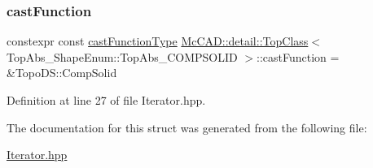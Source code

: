 \subsubsection{\texorpdfstring{cast\+Function}{castFunction}}
{\footnotesize\ttfamily constexpr const \hyperlink{structMcCAD_1_1detail_1_1TopClass_3_01TopAbs__ShapeEnum_1_1TopAbs__COMPSOLID_01_4_a110312d2c20be779990d50a4ca68b71f}{cast\+Function\+Type} \hyperlink{structMcCAD_1_1detail_1_1TopClass}{Mc\+C\+A\+D\+::detail\+::\+Top\+Class}$<$ Top\+Abs\+\_\+\+Shape\+Enum\+::\+Top\+Abs\+\_\+\+C\+O\+M\+P\+S\+O\+L\+ID $>$\+::cast\+Function = \&Topo\+D\+S\+::\+Comp\+Solid\hspace{0.3cm}{\ttfamily [static]}}



Definition at line 27 of file Iterator.\+hpp.



The documentation for this struct was generated from the following file\+:\begin{DoxyCompactItemize}
\item 
\hyperlink{Iterator_8hpp}{Iterator.\+hpp}\end{DoxyCompactItemize}
